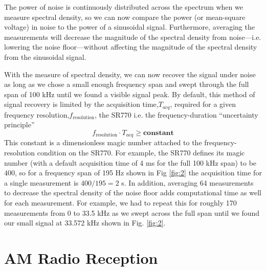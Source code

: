 \documentclass[prl,twocolumn,superscriptaddress,floatfix]{revtex4}
\begin{document}
The power of noise is continuously distributed across the spectrum when we measure spectral density, so we can now compare the power (or mean-square voltage) in noise to the power of a sinusoidal signal. Furthermore, averaging the measurements will decrease the magnitude of the spectral density from noise---i.e. lowering the noise floor---without affecting the magnitude of the spectral density from the sinusoidal signal. 

With the measure of spectral density, we can now recover the signal under noise as long as we chose a small enough frequency span and swept through the full span of 100 kHz until we found a visible signal peak. 
By default, this method of signal recovery is limited by the acquisition time,$T_{acq}$, required for a given frequency resolution,$f_\textrm{resolution}$, the SR770 i.e.
the frequency-duration ``uncertainty principle'' \cite{fouriermethods}
\begin{equation}
    f_\textrm{resolution} \cdot T_{acq} \geq \textbf{constant}
\end{equation}
This constant is a dimensionless magic number attached to the frequency-resolution condition on the SR770. For example,
the SR770 defines its magic number (with a default acquisition time of 4 ms for the full 100 kHz span)
to be $400$, so for a frequency span of 195 Hz shown in Fig \ref{fig:2} the acquisition time for a single measurement is $400 / 195 = 2$ s. In addition, averaging 64 measurements to decrease the spectral density of the noise floor adds computational time as well for each measurement. For example, we had to repeat this for roughly 170 measurements from 0 to 33.5 kHz as we swept across the full span until we found our small signal at 33.572 kHz shown in Fig. \ref{fig:2}.

\section{AM Radio Reception}
\end{document}
